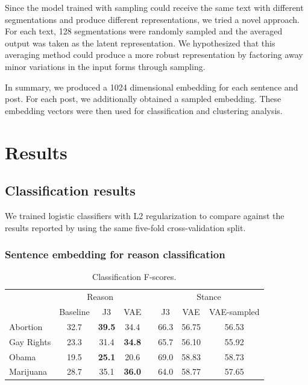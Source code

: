\documentclass[11pt]{article}
\begin{document}
Since the model trained with sampling could receive the same text with different segmentations
and produce different representations,
we tried a novel approach.
For each text, 128 segmentations were randomly sampled
and the averaged output was taken as the latent representation.
We hypothesized that this averaging method could produce a more robust representation
by factoring away minor variations in the input forms through sampling.

In summary,
we produced a 1024 dimensional embedding for each sentence and post.
For each post, we additionally obtained a sampled embedding.
These embedding vectors were then used for classification and clustering analysis.

\section{Results}\label{sec:results}

\subsection{Classification results}\label{sec:class-results}

We trained logistic classifiers with L2 regularization
to compare against the results reported by \textcite{hasan2014you}
using the same five-fold cross-validation split.

\subsubsection*{Sentence embedding for reason classification}

\begin{table}
  \centering
  \begin{tabular}{lccclccc}
    \toprule
    &\multicolumn{3}{c}{Reason} &&\multicolumn{3}{c}{Stance}\\
    &Baseline &J3 &VAE &&J3 &VAE &VAE-sampled\\
    \midrule
    Abortion  &32.7 &\textbf{39.5} &34.4  &&66.3 &56.75 &56.53\\
    Gay Rights &23.3 &31.4 &\textbf{34.8} &&65.7 &56.10 &55.92\\
    Obama     &19.5 &\textbf{25.1} &20.6  &&69.0 &58.83 &58.73\\
    Marijuana &28.7 &35.1 &\textbf{36.0}  &&64.0 &58.77 &57.65\\
    \bottomrule
  \end{tabular}
  \caption[]{\label{tab:classif}Classification F-scores.}
\end{table}
\end{document}
